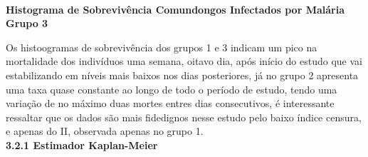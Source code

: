 \documentclass[12pt,a4paper]{article}
\begin{document}
\begin{center}
{
		}
	\vspace{1cm}\\
	\textbf{Histograma de Sobrevivência Comundongos Infectados por Malária Grupo 3}
	\end{center}
	\vspace{1cm}
	Os histoogramas de sobrevivência dos grupos 1 e 3 indicam um pico na mortalidade dos indivíduos uma semana, oitavo dia, após início do estudo que vai estabilizando em níveis mais baixos nos dias posteriores, já no grupo 2 apresenta uma taxa quase constante ao longo de todo o período de estudo, tendo uma variação de no máximo duas mortes entres dias consecutivos, é interessante ressaltar que os dados são mais fidedignos nesse estudo pelo baixo índice censura, e apenas do II, observada apenas no grupo 1.
	\vspace{1cm}\\
	\textbf{3.2.1 Estimador Kaplan-Meier}
	\vspace{1cm}\\
\end{document}
